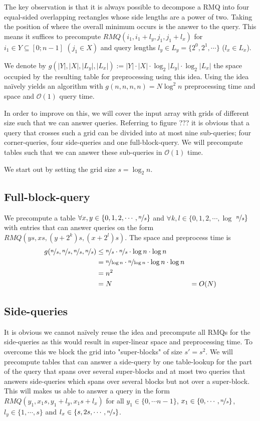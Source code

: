 \documentclass[a4paper,oneside,article,11pt]{memoir}
\begin{document}
The key observation is that it is always possible to decompose a RMQ into four equal-sided overlapping rectangles whose side lengths are a power of two. Taking the position of where the overall minimum occurs is the answer to the query. This means it suffices to precompute $RMQ(i_1,i_1 + l_y,j_1,j_1 + l_x)$ for $i_1 \in Y \subseteq [0;n-1]$ $(j_1 \in X)$ and query lengths $l_y \in L_y = \{2^0, 2^1, \cdots \}$ ($l_x \in L_x$).

We denote by $g(\lvert Y \rvert, \lvert X \rvert, \lvert L_y \rvert, \lvert L_x \rvert) := \lvert Y \rvert \cdot \lvert X \rvert \cdot \log_2 \lvert L_y \rvert \cdot \log_2 \lvert L_x \rvert$ the space occupied by the resulting table for preprocessing using this idea. Using the idea naïvely yields an algorithm with $g(n,n,n,n) = N \log^2 n$ preprocessing time and space and $\mathcal{O}(1)$ query time.

In order to improve on this, we will cover the input array with grids of different size such that we can answer queries. Referring to figure ??? it is obvious that a query that crosses such a grid can be divided into at most nine sub-queries; four corner-queries, four side-queries and one full-block-query. We will precompute tables such that we can answer these sub-queries in $\mathcal{O}(1)$ time.

We start out by setting the grid size $s = \log_2 n$.

\subsection{Full-block-query}
We precompute a table $\forall x,y \in \{0,1,2, \cdots, \nicefrac{n}{s} \}$ and $\forall k,l \in \{0,1,2, \cdots, \log$ $\nicefrac{n}{s} \}$ with entries that can answer queries on the form $RMQ(ys,xs,(y+2^k)s,(x+2^l)s)$. The space and preprocess time is
\begin{align}
g(\nicefrac{n}{s}, \nicefrac{n}{s}, \nicefrac{n}{s}, \nicefrac{n}{s}) &\leq \nicefrac{n}{s} \cdot \nicefrac{n}{s} \cdot \log n \cdot \log n \\ &= \nicefrac{n}{\log n} \cdot \nicefrac{n}{\log n} \cdot \log n \cdot \log n \\ &= n^2 \\ &= N &= O(N)
\end{align}


\subsection{Side-queries}
It is obvious we cannot naïvely reuse the idea and precompute all RMQs for the side-queries as this would result in super-linear space and preprocessing time. To overcome this we block the grid into "super-blocks" of size $s' = s^2$. We will precompute tables that can answer a side-query by one table-lookup for the part of the query that spans over several super-blocks and at most two queries that answers side-queries which spans over several blocks but not over a super-block. This will makes us able to answer a query in the form $RMQ(y_1,x_1s,y_1+l_y,x_1s+l_x)$ for all $y_1 \in \{0, \cdots n-1 \}$, $x_1 \in \{0, \cdots, \nicefrac{n}{s} \}$, $l_y \in \{1, \cdots, s \}$ and $l_x \in \{s,2s, \cdots, \nicefrac{n}{s} \}$.
\end{document}
